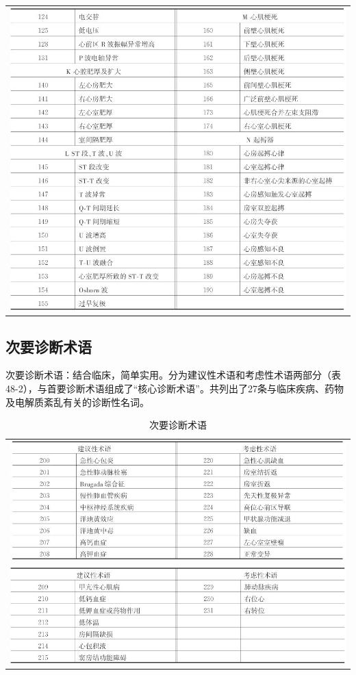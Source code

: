 \begin{longtable}{c}
\includegraphics[width=\textwidth,height=\textheight,keepaspectratio]{./images/Image00749.jpg}
\end{longtable}

\protect\hypertarget{text00057.htmlux5cux23subid704}{}{}

\subsection{次要诊断术语}

次要诊断术语：结合临床，简单实用。分为建议性术语和考虑性术语两部分（表48-2），与首要诊断术语组成了“核心诊断术语”。共列出了27条与临床疾病、药物及电解质紊乱有关的诊断性名词。

\begin{longtable}{c}
  \caption{次要诊断术语}
  \label{tab48-2}\\
  \endfirsthead
  \caption[]{次要诊断术语}
  \endhead
\includegraphics[width=\textwidth,height=\textheight,keepaspectratio]{./images/Image00750.jpg}\\
\includegraphics[width=\textwidth,height=\textheight,keepaspectratio]{./images/Image00751.jpg}
\end{longtable}

